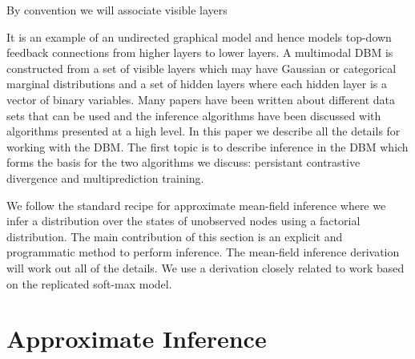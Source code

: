 \documentclass{article} %
\begin{document}
  By convention we will associate visible layers



 It is an example of an undirected graphical model and hence models top-down feedback connections
from higher layers to lower layers.  A multimodal DBM is constructed from a set of visible layers which may have Gaussian or categorical
marginal distributions and a set of hidden layers where each hidden layer is a vector of binary variables.  Many papers have been written
about different data sets that can be used and the inference algorithms have been discussed with algorithms presented at a high level.
In this paper we describe all the details for working with the DBM.  The first topic is to describe inference in the DBM which forms
the basis for the two algorithms we discuss: persistant contrastive divergence and multiprediction training.

We follow the standard recipe for approximate mean-field inference where we infer a distribution over the states of unobserved nodes
using a factorial distribution.  The main contribution of this section is an explicit and programmatic method to perform inference.
The mean-field inference derivation will work out all of the details.  We use a derivation closely related to work 
based on the replicated
soft-max model.

\section{Approximate Inference}
\end{document}
